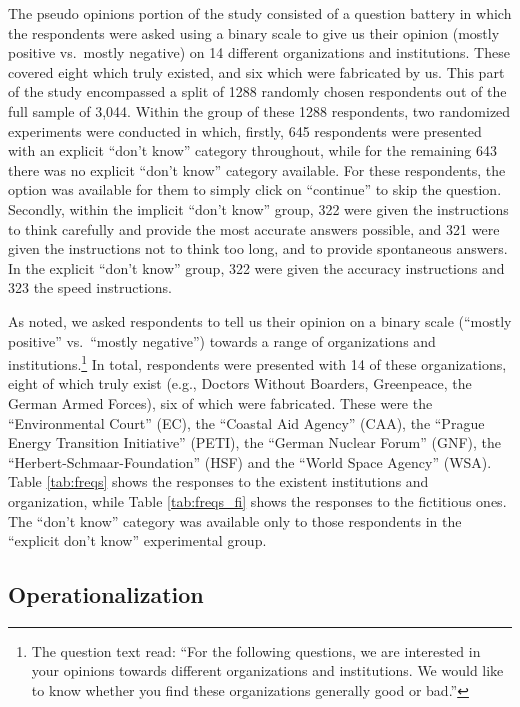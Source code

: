 \documentclass[Royal,times,sageh]{sagej}
\begin{document}
The pseudo opinions portion of the study consisted of a question battery
in which the respondents were asked using a binary scale to give us
their opinion (mostly positive vs.~mostly negative) on 14 different
organizations and institutions. These covered eight which truly existed,
and six which were fabricated by us. This part of the study encompassed
a split of 1288 randomly chosen respondents out of the full sample of
3,044. Within the group of these 1288 respondents, two randomized
experiments were conducted in which, firstly, 645 respondents were
presented with an explicit ``don't know'' category throughout, while for
the remaining 643 there was no explicit ``don't know'' category
available. For these respondents, the option was available for them to
simply click on ``continue'' to skip the question. Secondly, within the
implicit ``don't know'' group, 322 were given the instructions to think
carefully and provide the most accurate answers possible, and 321 were
given the instructions not to think too long, and to provide spontaneous
answers. In the explicit ``don't know'' group, 322 were given the
accuracy instructions and 323 the speed instructions.

As noted, we asked respondents to tell us their opinion on a binary
scale (``mostly positive'' vs.~``mostly negative'') towards a range of
organizations and institutions.\footnote{The question text read: ``For
  the following questions, we are interested in your opinions towards
  different organizations and institutions. We would like to know
  whether you find these organizations generally good or bad.''} In
total, respondents were presented with 14 of these organizations, eight
of which truly exist (e.g., Doctors Without Boarders, Greenpeace, the
German Armed Forces), six of which were fabricated. These were the
``Environmental Court'' (EC), the ``Coastal Aid Agency'' (CAA), the
``Prague Energy Transition Initiative'' (PETI), the ``German Nuclear
Forum'' (GNF), the ``Herbert-Schmaar-Foundation'' (HSF) and the ``World
Space Agency'' (WSA). Table \ref{tab:freqs} shows the responses to the
existent institutions and organization, while Table \ref{tab:freqs_fi}
shows the responses to the fictitious ones. The ``don't know'' category
was available only to those respondents in the ``explicit don't know''
experimental group.

\hypertarget{operationalization}{%
\subsection{Operationalization}\label{operationalization}}
\end{document}
